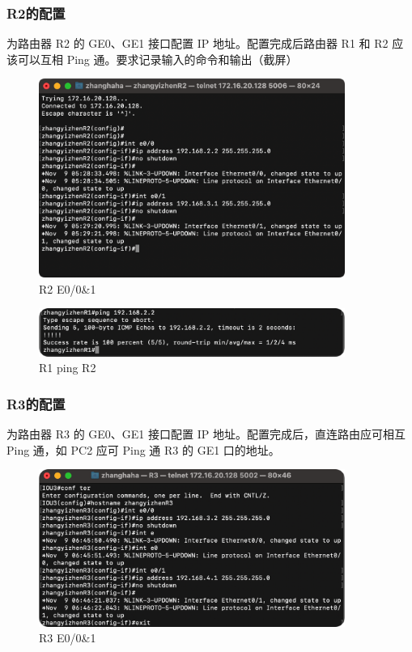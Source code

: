 \documentclass[a4paper,12pt]{report}
\begin{document}
\begin{spacing}{1.5}
\subsubsection{R2的配置}
为路由器 R2 的 GE0、GE1 接口配置 IP 地址。配置完成后路由器 R1 和 R2 应该可以互相 Ping 通。要求记录输入的命令和输出（截屏）
\begin{figure}[htb!]
  \centering
\includegraphics[width=10cm]{figure/R2e.png}
\caption{R2 E0/0\&1}
\label{10}
\end{figure}
\begin{figure}[htb!]
  \centering
\includegraphics[width=10cm]{figure/R1pingR2.png}
\caption{R1 ping R2}
\label{11}
\end{figure}


\subsubsection{R3的配置}
为路由器 R3 的 GE0、GE1 接口配置 IP 地址。配置完成后，直连路由应可相互 Ping 通，如 PC2 应可 Ping 通 R3 的 GE1 口的地址。
\begin{figure}[htb!]
  \centering
\includegraphics[width=10cm]{figure/R3e.png}
\caption{R3 E0/0\&1}
\label{12}
\end{figure}


\end{spacing}
\end{document}
